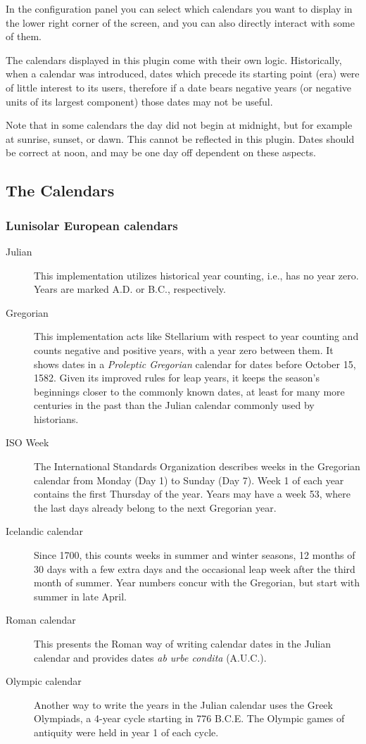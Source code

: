 In the configuration panel you can select which calendars you want to
display in the lower right corner of the screen, and you can also directly
interact with some of them.


The calendars displayed in this plugin come with their own
logic. Historically, when a calendar was introduced, dates which
precede its starting point (era) were of little interest to its users,
therefore if a date bears negative years (or negative units of its
largest component) those dates may not be useful.

Note that in some calendars the day did not begin at midnight, but for
example at sunrise, sunset, or dawn. This cannot be reflected in this
plugin. Dates should be correct at noon, and may be one day off
dependent on these aspects.

\subsection{The Calendars}
\subsubsection{Lunisolar European calendars}
\begin{description}
\item[Julian] This implementation utilizes historical year counting,
  i.e., has no year zero. Years are marked A.D. or B.C., respectively.
\item[Gregorian] This implementation acts like Stellarium with respect
  to year counting and counts negative and positive years, with a year
  zero between them. It shows dates in a \emph{Proleptic Gregorian}
  calendar for dates before October 15, 1582. Given its improved rules
  for leap years, it keeps the season's beginnings closer to the
  commonly known dates, at least for many more centuries in the past
  than the Julian calendar commonly used by historians.
\item[ISO Week] The International Standards Organization describes
  weeks in the Gregorian calendar from Monday (Day 1) to Sunday (Day
  7). Week 1 of each year contains the first Thursday of the
  year. Years may have a week 53, where the last days already belong
  to the next Gregorian year.
\item[Icelandic calendar] Since 1700, this counts weeks in summer and
  winter seasons, 12 months of 30 days with a few extra days and the
  occasional leap week after the third month of summer. Year numbers
  concur with the Gregorian, but start with summer in late April.
\item[Roman calendar] This presents the Roman way of writing calendar
  dates in the Julian calendar and provides dates \emph{ab urbe condita} (A.U.C.).
\item[Olympic calendar] Another way to write the years in the Julian
  calendar uses the Greek Olympiads, a 4-year cycle starting in 776
  B.C.E. The Olympic games of antiquity were held in year 1 of each cycle.
\end{description}

